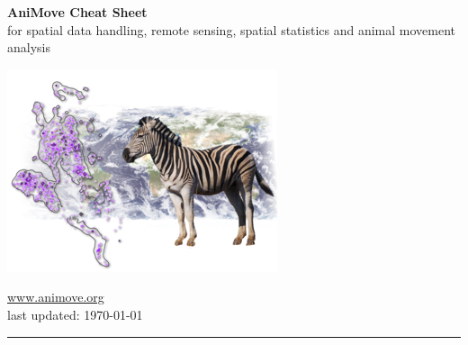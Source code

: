 \documentclass[10pt,landscape]{article}
\begin{document}
\newlength{\MyLen}


\raggedright
\footnotesize
\begin{multicols}{3}


\setlength{\premulticols}{1pt}
\setlength{\postmulticols}{1pt}
\setlength{\multicolsep}{1pt}
\setlength{\columnsep}{2pt}

\begin{center}
     \Large{\textbf{AniMove Cheat Sheet}} \\
     for spatial data handling, remote sensing, spatial statistics and animal movement analysis
\end{center}

\begin{center}
 \includegraphics[width=.22\textwidth]{pics/animove_org_WegmannBevanda_zebra_africa_dbb_light.png}
\end{center}


\url{www.animove.org}\\
last updated: \today

\rule{0.32\textwidth}{0.4pt}



\end{multicols}
\end{document}
